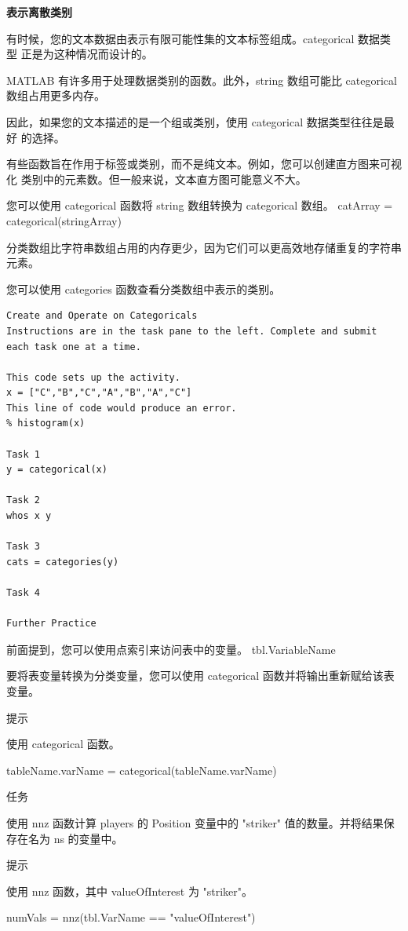 \documentclass[12pt,a4paper]{article}
\begin{document}
\textbf{表示离散类别}

有时候，您的文本数据由表示有限可能性集的文本标签组成。categorical 数据类型
正是为这种情况而设计的。

MATLAB 有许多用于处理数据类别的函数。此外，string 数组可能比 categorical 
数组占用更多内存。

因此，如果您的文本描述的是一个组或类别，使用 categorical 数据类型往往是最好
的选择。

有些函数旨在作用于标签或类别，而不是纯文本。例如，您可以创建直方图来可视化
类别中的元素数。但一般来说，文本直方图可能意义不大。

您可以使用 categorical 函数将 string 数组转换为 categorical 数组。
catArray = categorical(stringArray)

分类数组比字符串数组占用的内存更少，因为它们可以更高效地存储重复的字符串元素。

您可以使用 categories 函数查看分类数组中表示的类别。


\begin{lstlisting}
Create and Operate on Categoricals
Instructions are in the task pane to the left. Complete and submit each task one at a time.

This code sets up the activity.
x = ["C","B","C","A","B","A","C"]
This line of code would produce an error.
% histogram(x)

Task 1
y = categorical(x)

Task 2
whos x y

Task 3
cats = categories(y)

Task 4

Further Practice

\end{lstlisting}

前面提到，您可以使用点索引来访问表中的变量。
tbl.VariableName

要将表变量转换为分类变量，您可以使用 categorical 函数并将输出重新赋给该表变量。

提示

使用 categorical 函数。

tableName.varName = categorical(tableName.varName)

任务

使用 nnz 函数计算 players 的 Position 变量中的 "striker" 值的数量。并将结果保存在名为 ns 的变量中。

提示

使用 nnz 函数，其中 valueOfInterest 为 "striker"。

numVals = nnz(tbl.VarName == "valueOfInterest")
\end{document}
